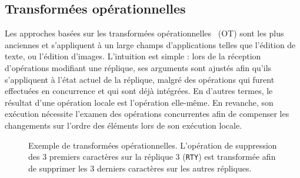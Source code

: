 

\subsection{Transformées opérationnelles}
\label{repl:subsec:ot}

Les approches basées sur les transformées
opérationnelles~\cite{sun1998operational, sun2009contextbased} (OT) sont les
plus anciennes et s'appliquent à un large champs d'applications telles que
l'édition de texte, ou l'édition d'images. L'intuition est simple : lors de la
réception d'opérations modifiant une réplique, ses arguments sont ajustés afin
qu'ils s'appliquent à l'état actuel de la réplique, malgré des opérations qui
furent effectuées en concurrence et qui sont déjà intégrées. En d'autres termes,
le résultat d'une opération locale est l'opération elle-même. En revanche, son
exécution nécessite l'examen des opérations concurrentes afin de compenser les
changements sur l'ordre des éléments lors de son exécution locale.

\begin{figure}
  \centering
  
  \caption[Exemple de transformées opérationnelles] {\label{repl:fig:otexample}
    Exemple de transformées opérationnelles. L'opération de suppression des 3
    premiers caractères sur la réplique 3 (\texttt{RTY}) est transformée afin de
    supprimer les 3 derniers caractères sur les autres répliques.}
\end{figure}

